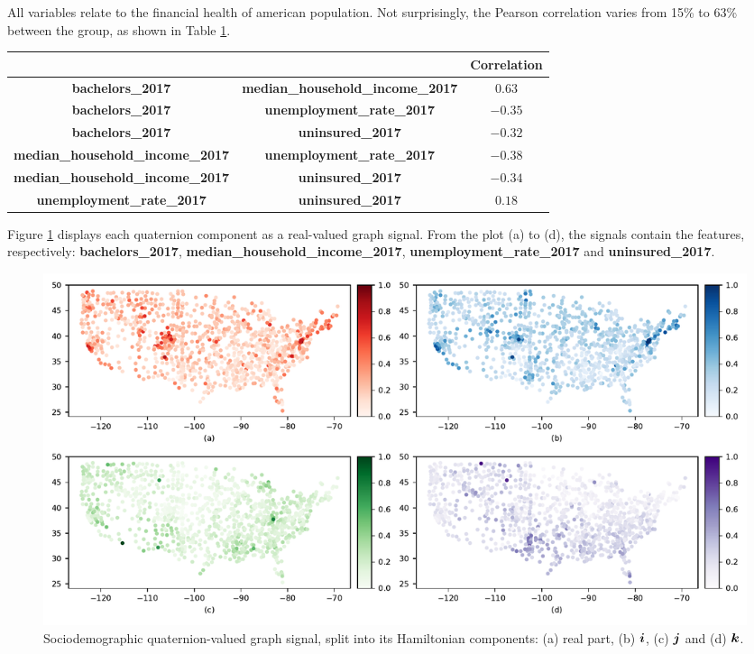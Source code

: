 All variables relate to the financial health of american population. Not surprisingly, the Pearson correlation varies from 15\% to 63\% between the group, as shown in Table \ref{tab:02}.
\begin{table}[!h]
\center
{}
\label{tab:02}
\begin{tabular*}{\textwidth}{ccc}
\toprule
& & \textbf{Correlation}\\
\midrule
\textbf{bachelors\_2017} & \textbf{median\_household\_income\_2017} & $0.63$ \\
\textbf{bachelors\_2017} & \textbf{unemployment\_rate\_2017} & $-0.35$ \\
\textbf{bachelors\_2017} & \textbf{uninsured\_2017} & $-0.32$ \\
\textbf{median\_household\_income\_2017} & \textbf{unemployment\_rate\_2017} & $-0.38$ \\
\textbf{median\_household\_income\_2017} & \textbf{uninsured\_2017} & $-0.34$ \\
\textbf{unemployment\_rate\_2017} & \textbf{uninsured\_2017} & $0.18$ \\
\bottomrule
\end{tabular*}
\end{table}

Figure \ref{fig:us_signal} displays each quaternion component as a real-valued graph signal. From the plot (a) to (d), the signals contain the features, respectively: \textbf{bachelors\_2017}, \textbf{median\_household\_income\_2017}, \textbf{unemployment\_rate\_2017} and \textbf{uninsured\_2017}.

\begin{figure}
	\centering
	\includegraphics[width=0.95\linewidth]{thesis/Figures/us_signal.pdf}
	\caption{Sociodemographic quaternion-valued graph signal, split into its Hamiltonian components: (a) real part, (b) $\boldsymbol{i}$, (c) $\boldsymbol{j}$ and (d) $\boldsymbol{k}$.}
	\label{fig:us_signal}
\end{figure}

